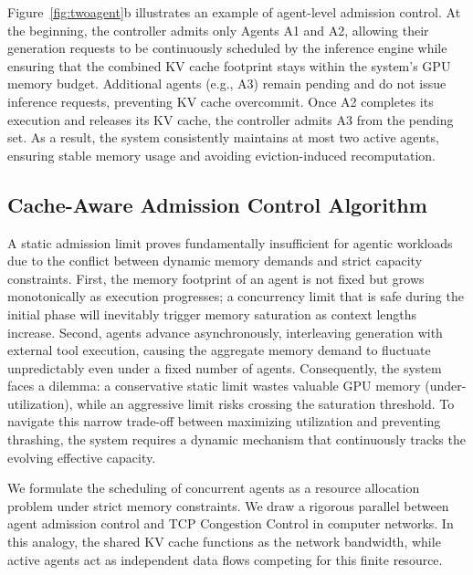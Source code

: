 Figure~\ref{fig:twoagent}b illustrates an example of agent-level admission control.
At the beginning, the controller admits only Agents A1 and A2, allowing their generation requests to be continuously scheduled by the inference engine while ensuring that the combined KV cache footprint stays within the system’s GPU memory budget.
Additional agents (e.g., A3) remain pending and do not issue inference requests, preventing KV cache overcommit.
Once A2 completes its execution and releases its KV cache, the controller admits A3 from the pending set.
As a result, the system consistently maintains at most two active agents, ensuring stable memory usage and avoiding eviction-induced recomputation.


\subsection{Cache-Aware Admission Control Algorithm}
\label{subsec:AIMD}

A static admission limit proves fundamentally insufficient for agentic workloads due to the conflict between dynamic memory demands and strict capacity constraints.
First, the memory footprint of an agent is not fixed but grows monotonically as execution progresses; a concurrency limit that is safe during the initial phase will inevitably trigger memory saturation as context lengths increase.
Second, agents advance asynchronously, interleaving generation with external tool execution, causing the aggregate memory demand to fluctuate unpredictably even under a fixed number of agents.
Consequently, the system faces a dilemma: a conservative static limit wastes valuable GPU memory (under-utilization), while an aggressive limit risks crossing the saturation threshold.
To navigate this narrow trade-off between maximizing utilization and preventing thrashing, the system requires a dynamic mechanism that continuously tracks the evolving effective capacity.

We formulate the scheduling of concurrent agents as a resource allocation problem under strict memory constraints. We draw a rigorous parallel between agent admission control and TCP Congestion Control in computer networks. In this analogy, the shared KV cache functions as the network bandwidth, while active agents act as independent data flows competing for this finite resource.

